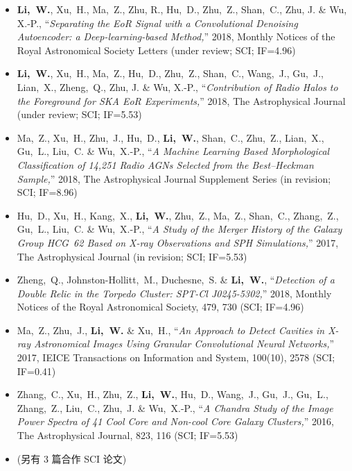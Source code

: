 \documentclass[zh]{resume}
\begin{document}
\begin{itemize}
  \small
  \item \textbf{Li,~W.}, Xu,~H., Ma,~Z., Zhu, R., Hu,~D., Zhu,~Z.,
    Shan,~C., Zhu, J. \& Wu, X.-P.,
    \enquote{\it Separating the EoR Signal with a Convolutional Denoising
      Autoencoder: a Deep-learning-based Method,}
    2018, Monthly Notices of the Royal Astronomical Society Letters
    (under review; SCI; IF=4.96)
  \item \textbf{Li,~W.}, Xu,~H., Ma,~Z., Hu,~D., Zhu,~Z., Shan,~C.,
    Wang,~J., Gu,~J., Lian,~X., Zheng,~Q., Zhu, J. \& Wu, X.-P.,
    \enquote{\it Contribution of Radio Halos to the Foreground for
      SKA EoR Experiments,}
    2018, The Astrophysical Journal (under review; SCI; IF=5.53)
  \item Ma,~Z., Xu,~H., Zhu,~J., Hu,~D., \textbf{Li,~W.}, Shan,~C., Zhu,~Z.,
    Lian,~X., Gu,~L., Liu,~C. \& Wu,~X.-P.,
    \enquote{\it A Machine Learning Based Morphological Classification
      of 14,251 Radio AGNs Selected from the Best--Heckman Sample,}
    2018, The Astrophysical Journal Supplement Series
    (in revision; SCI; IF=8.96)
  \item Hu,~D., Xu,~H., Kang,~X., \textbf{Li,~W.}, Zhu,~Z., Ma,~Z.,
    Shan,~C., Zhang,~Z., Gu,~L., Liu,~C. \& Wu,~X.-P.,
    \enquote{\it A Study of the Merger History of the Galaxy Group
      HCG~62 Based on X-ray Observations and SPH Simulations,}
    2017, The Astrophysical Journal
    (in revision; SCI; IF=5.53)
  \item Zheng,~Q., Johnston-Hollitt,~M., Duchesne,~S. \& \textbf{Li,~W.},
    \enquote{\it Detection of a Double Relic in the Torpedo Cluster:
      SPT-Cl J0245-5302,}
    2018, Monthly Notices of the Royal Astronomical Society, 479, 730
    (SCI; IF=4.96)
  \item Ma,~Z., Zhu,~J., \textbf{Li,~W.} \& Xu,~H.,
    \enquote{\it An Approach to Detect Cavities in X-ray Astronomical
      Images Using Granular Convolutional Neural Networks,}
    2017, IEICE Transactions on Information and System, 100(10), 2578
    (SCI; IF=0.41)
  \item Zhang,~C., Xu,~H., Zhu,~Z., \textbf{Li,~W.}, Hu,~D., Wang,~J.,
    Gu,~J., Gu,~L., Zhang,~Z., Liu,~C., Zhu,~J. \& Wu,~X.-P.,
    \enquote{\it A Chandra Study of the Image Power Spectra of 41
      Cool Core and Non-cool Core Galaxy Clusters,}
    2016, The Astrophysical Journal, 823, 116 (SCI; IF=5.53)
  \item (另有 3 篇合作 SCI 论文)
\end{itemize}
\end{document}
